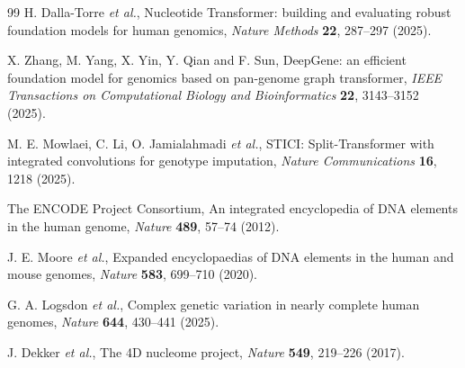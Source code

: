 \IfFileExists{ws-procs11x85.cls}{\worldscientificclasstrue\documentclass{ws-procs11x85}}{\worldscientificclassfalse\documentclass[11pt]{article}\usepackage[margin=1in]{geometry}}
\begin{document}
\begin{thebibliography}{99}
H. Dalla-Torre \textit{et al.}, Nucleotide Transformer: building and evaluating
robust foundation models for human genomics, \textit{Nature Methods}
\textbf{22}, 287--297 (2025).

X. Zhang, M. Yang, X. Yin, Y. Qian and F. Sun, DeepGene: an efficient foundation
model for genomics based on pan-genome graph transformer, \textit{IEEE
Transactions on Computational Biology and Bioinformatics} \textbf{22},
3143--3152 (2025).

M. E. Mowlaei, C. Li, O. Jamialahmadi \textit{et al.}, STICI: Split-Transformer
with integrated convolutions for genotype imputation, \textit{Nature
Communications} \textbf{16}, 1218 (2025).

The ENCODE Project Consortium, An integrated encyclopedia of DNA elements in the
human genome, \textit{Nature} \textbf{489}, 57--74 (2012).

J. E. Moore \textit{et al.}, Expanded encyclopaedias of DNA elements in the human
and mouse genomes, \textit{Nature} \textbf{583}, 699--710 (2020).

G. A. Logsdon \textit{et al.}, Complex genetic variation in nearly complete
human genomes, \textit{Nature} \textbf{644}, 430--441 (2025).

J. Dekker \textit{et al.}, The 4D nucleome project, \textit{Nature}
\textbf{549}, 219--226 (2017).

\end{thebibliography}
\end{document}

